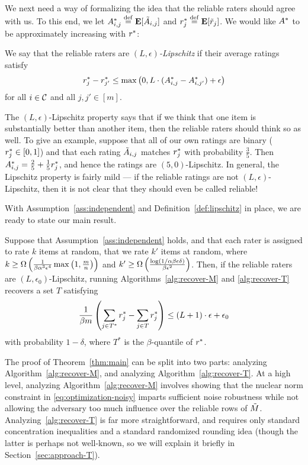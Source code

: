 We next need a way of formalizing the idea that the reliable raters should 
agree with us. To this end, we let 
$A^*_{i,j} \stackrel{\rm def}{=} \mathbf{E}[\tilde{A}_{i,j}]$ and $r^*_j \stackrel{\rm def}{=} \mathbf{E}[\tilde{r}_j]$. We 
would like $A^*$ to be approximately increasing with $r^*$:
\begin{definition}
\label{def:lipschitz}
We say that the reliable raters are \emph{$(L,\epsilon)$-Lipschitz} if their 
average ratings satisfy
\begin{equation}
\label{eq:lipschitz}
r^*_j - r^*_{j'} \leq \max\left( 0, L \cdot (A^*_{i,j} - A^*_{i,j'}) + \epsilon \right)
\end{equation}
for all $i \in \mathcal{C}$ and all $j,j' \in [m]$.
\end{definition}
The $(L,\epsilon)$-Lipschitz property says that if we think that one item is 
substantially better than another item, then the reliable raters should think 
so as well. To give an example, suppose that all of our own ratings are binary 
($r^*_j \in [0,1]$) and that each rating $\tilde{A}_{i,j}$ matches $r^*_j$ 
with probability $\frac{3}{5}$. Then 
$A^*_{i,j} = \frac{2}{5} + \frac{1}{5}r^*_j$, 
and hence the ratings are $(5,0)$-Lipschitz. 
In general, the Lipschitz property is fairly mild --- if the reliable ratings 
are not $(L,\epsilon)$-Lipschitz, then it is not clear that they should 
even be called reliable!

With Assumption~\ref{ass:independent} and Definition~\ref{def:lipschitz} 
in place, we are ready to state our main result. 

\begin{theorem}
\label{thm:main}
Suppose that Assumption~\ref{ass:independent} holds, and that each rater is 
assigned to rate $k$ items at random, that we rate $k'$ items at random, 
where $k \geq \Omega\left( \frac{1}{\beta\alpha^3\epsilon^4}\max\left( 1, \frac{m}{n} \right) \right)$ 
and $k' \geq \Omega\left( \frac{\log(1/\alpha\beta\epsilon\delta)}{\beta\epsilon^2} \right)$.
Then, if the reliable raters are $(L,\epsilon_0)$-Lipschitz, running 
Algorithms~\ref{alg:recover-M} and \ref{alg:recover-T} recovers a set 
$T$ satisfying 
\[ \frac{1}{\beta m} \left( \sum_{j \in T^*} r^*_j - \sum_{j \in T} r^*_j \right) 
\leq (L+1) \cdot \epsilon + \epsilon_0 \]
with probability $1-\delta$, where $T^*$ is the $\beta$-quantile of $r^*$.
\end{theorem}

The proof of Theorem~\ref{thm:main} can be split into two parts: analyzing 
Algorithm~\ref{alg:recover-M}, and analyzing Algorithm~\ref{alg:recover-T}. 
At a high level, analyzing Algorithm~\ref{alg:recover-M} involves showing that 
the nuclear norm constraint in \eqref{eq:optimization-noisy} imparts sufficient 
noise robustness while not allowing the adversary too much influence over the 
reliable rows of $\tilde{M}$. Analyzing~\ref{alg:recover-T} is far more straightforward, 
and requires only standard concentration inequalities and a standard randomized 
rounding idea (though the latter is perhaps not well-known, so we will explain 
it briefly in Section~\ref{sec:approach-T}).

